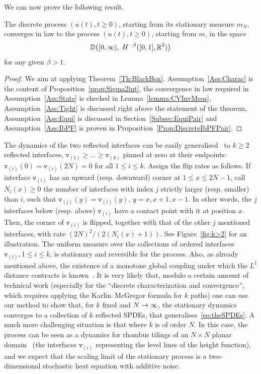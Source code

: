 \documentclass[AHL,Unicode,longabstracts]{cedram}
\theoremstyle{plain}
\newcommand{\ttv}{\mathtt{v}}
\newcommand{\bbD}{\mathbb{D}}
\newcommand{\R}{\mathbb{R}}
\let\originalleft\left
\let\originalright\right
\renewcommand{\left}{\mathopen{}\mathclose\bgroup\originalleft}
\renewcommand{\right}{\aftergroup\egroup\originalright}
\renewcommand*{\to}{\mathchoice{\longrightarrow}{\rightarrow}{\rightarrow}{\rightarrow}}
\begin{document}
We can now prove the following result.

\begin{theo}\label{Th:Pair}
The discrete process $(u(t), t\ge 0)$, starting from its stationary measure $m_N$, converges in law to the process $(u(t),t\ge 0)$, starting from $m$, in the space
\[
\bbD\left([0,\infty),\;H^{-\beta}([0,1], \R^2)\right)
\]
for any given $\beta > 1$.
\end{theo}
\begin{proof}
We aim at applying Theorem~\ref{Th:BlackBox}. Assumption~\ref{Ass:Charac} is the content of Proposition~\ref{prop:Sigma2int}, the convergence in law required in Assumption~\ref{Ass:State} is checked in Lemma~\ref{lemma:CVInvMeas}, Assumption~\ref{Ass:Tight} is discussed right above the statement of the theorem, Assumption~\ref{Ass:Equi} is discussed in Section~\ref{Subsec:EquiPair} and Assumption~\ref{Ass:IbPF} is proven in Proposition~\ref{Prop:DiscreteIbPFPair}.
\end{proof}


\begin{rema}\label{rem:k>2}
The dynamics of the two reflected
interfaces can be easily generalised~\cite{luby2001markov,wilson2004mixing} to $k\ge 2$ reflected interfaces, $\ttv_{(1)}\ge \dots\ge \ttv_{(k)}$ pinned at zero at their endpoints: $\ttv_{(i)}(0)=\ttv_{(i)}(2N)=0$ for all $1\le i\le k$. Assign the flip rates as follows. If interface $\ttv_{(i)}$ has an upward (resp. downward) corner at $1\le x\le 2N-1$, call $N_i(x)\ge0$ the number of interfaces with index $j$ strictly larger (resp. smaller) than $i$, such that $\ttv_{(j)}(y)=\ttv_{(i)}(y)$, $y=x,x+1,x-1$. In other words, the $j$ interfaces below (resp. above) $\ttv_{(i)}$ have a contact point with it at position $x$. Then, the corner of $\ttv_{(i)}$ is flipped, together with that of the other $j$ mentioned interfaces, with rate $(2N)^2/(2 (N_i(x)+1))$. See Figure~\ref{fig:k>2} for an illustration. The uniform measure over the collections of ordered interfaces $\ttv_{(i)},1\le i\le k$, is stationary and reversible for the process. Also, as already mentioned above, the existence of a monotone global coupling under which the $L^1$ distance contracts is known~\cite{wilson2004mixing}. It is very likely that, modulo a certain amount of technical work (especially for the ``discrete characterization and convergence'', which requires applying the Karlin--McGregor formula for $k$ paths) one can use our method to show that, for $k$ fixed and $N\to\infty$, the stationary dynamics converges to a collection of $k$ reflected SPDEs, that generalises~\eqref{eq:theSPDEs}. A much more challenging situation is that where $k$ is of order $N$. In this case, the process can be seen as a dynamics for rhombus tilings of an $N\times N$ planar domain~\cite{wilson2004mixing} (the interfaces $\ttv_{(i)}$ representing the level lines of the height function), and we expect that the scaling limit of the stationary process is a two-dimensional stochastic heat equation with additive noise.
\end{rema}
\end{document}
